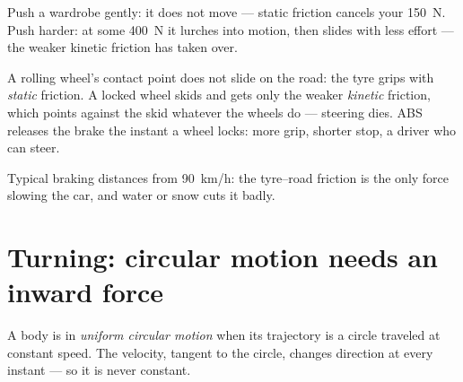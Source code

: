 \begin{example}\label{ex:g11:forces-and-motion:wardrobe}
Push a wardrobe gently: it does not move --- static friction cancels
your \qty{150}{N}. Push harder: at some \qty{400}{N} it lurches into
motion, then slides with less effort --- the weaker kinetic friction
has taken over.
\end{example}

\begin{remark}\label{rem:g11:forces-and-motion:abs}
A rolling wheel's contact point does not slide on the road: the tyre
grips with \emph{static} friction. A locked wheel skids and gets only
the weaker \emph{kinetic} friction, which points against the skid
whatever the wheels do --- steering dies. ABS releases the brake the
instant a wheel locks: more grip, shorter stop, a driver who can steer.
\end{remark}

\begin{omfigure}

{\small Typical braking distances from \qty{90}{km/h}: the tyre--road
friction is the only force slowing the car, and water or snow cuts it badly.}
\end{omfigure}

\section{Turning: circular motion needs an inward force}

\begin{definition}\label{def:g11:forces-and-motion:ucm}
A body is in \emph{uniform circular motion} when its trajectory is a circle traveled at constant speed. The
velocity, tangent to the circle, changes direction at every instant ---
so it is never constant.
\end{definition}

